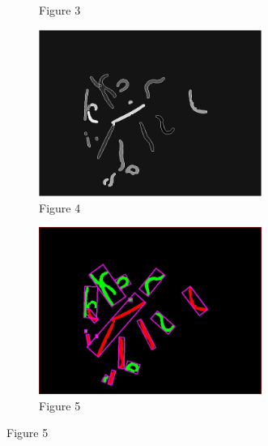 \documentclass[a4paper,12pt]{article}
\begin{document}
\begin{figure}[ht!]
\begin{subfigure}{0.5\textwidth}
        \captionsetup{labelformat=empty}
        \caption{Figure 3}
    \end{subfigure}%
    \begin{subfigure}{0.5\textwidth}
        \centering
        \includegraphics[width=0.8\textwidth]{A01_step2_markers.jpg}
        \captionsetup{labelformat=empty}
        \caption{Figure 4}
    \end{subfigure}
    \centering
    \begin{subfigure}{0.8\textwidth}
        \centering
        \includegraphics[width=0.8\textwidth]{A01_step3.jpg}
        \captionsetup{labelformat=empty}
        \caption{Figure 5}
    \end{subfigure}
\end{figure}
\end{document}
